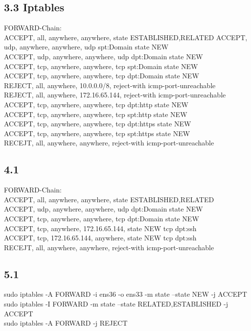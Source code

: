 \documentclass[12pt]{article}
\theoremstyle{plain}
\begin{document}
\subsection*{3.3 Iptables}
FORWARD-Chain:\\
ACCEPT, all, anywhere, anywhere, state ESTABLISHED,RELATED
ACCEPT, udp, anywhere, anywhere, udp spt:Domain state NEW\\
ACCEPT, udp, anywhere, anywhere, udp dpt:Domain state NEW\\
ACCEPT, tcp, anywhere, anywhere, tcp spt:Domain state NEW\\
ACCEPT, tcp, anywhere, anywhere, tcp dpt:Domain state NEW\\
REJECT, all, anywhere, 10.0.0.0/8, reject-with icmp-port-unreachable\\
REJECT, all, anywhere, 172.16.65.144, reject-with icmp-port-unreachable\\
ACCEPT, tcp, anywhere, anywhere, tcp dpt:http state NEW\\
ACCEPT, tcp, anywhere, anywhere, tcp spt:http state NEW\\
ACCEPT, tcp, anywhere, anywhere, tcp dpt:https state NEW\\
ACCEPT, tcp, anywhere, anywhere, tcp spt:https state NEW\\
RECEJT, all, anywhere, anywhere, reject-with icmp-port-unreachable\\
\subsection*{4.1}
FORWARD-Chain:\\
ACCEPT, all, anywhere, anywhere, state ESTABLISHED,RELATED\\
ACCEPT, udp, anywhere, anywhere, udp dpt:Domain state NEW\\
ACCEPT, tcp, anywhere, anywhere, tcp dpt:Domain state NEW\\
ACCEPT, tcp, anywhere, 172.16.65.144, state NEW tcp dpt:ssh\\
ACCEPT, tcp, 172.16.65.144, anywhere, state NEW tcp dpt:ssh\\
RECEJT, all, anywhere, anywhere, reject-with icmp-port-unreachable\\
\subsection*{5.1}
sudo iptables -A FORWARD -i ens36 -o ens33 -m state --state NEW -j ACCEPT\\
sudo iptables -I FORWARD -m state --state RELATED,ESTABLISHED -j ACCEPT\\
sudo iptables -A FORWARD -j REJECT\\
\end{document}
